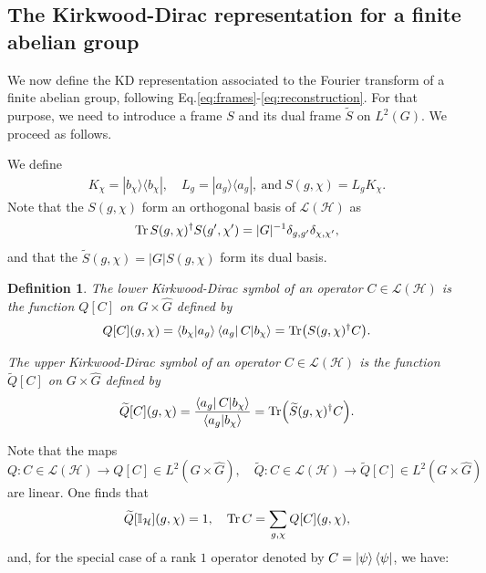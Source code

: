 \documentclass[a4paper, notitlepage, 11pt]{article}
\numberwithin{equation}{section}
\newcommand{\cket}[1]{|#1\rangle}
\newcommand{\bracket}[2]{\langle #1 | #2\rangle}
\newcommand{\mcl}[1]{\ensuremath{\mathcal{#1}}}
\newcommand{\Hcal}{{\mcl H}}
\newcommand{\bbone}{\mathbb{I}}
\renewcommand{\H}{\mcl{H}}
\newtheorem{definition}[Theorem]{Definition}
\begin{document}
\subsection{The Kirkwood-Dirac representation for a finite abelian group}\label{sec:KDsymbol}
We now define the KD representation associated to the Fourier transform of a finite abelian group, following Eq.\eqref{eq:frames}-\eqref{eq:reconstruction}. For that purpose, we need to introduce a frame $S$ and its dual frame $\widetilde{S}$ on $L^2(G)$. We proceed as follows.

We define
\begin{eqnarray}\label{eq:frame} K_\chi=|b_\chi\rangle\langle b_\chi|,\quad
 L_g=|a_g\rangle\langle a_g|, \mathrm{ \ and \ }  S(g, \chi)= L_g K_\chi.
\end{eqnarray}
Note that the $S(g,\chi)$ form an orthogonal basis of $\mathcal L(\mathcal H)$ as
\begin{equation}
    \Tr S(g,\chi)^\dagger S(g',\chi')=|G|^{-1}\delta_{g,g'}\delta_{\chi,\chi'},
\end{equation}
and that the $\widetilde{S}(g,\chi)=|G|S(g, \chi)$ form its dual basis. 
\begin{definition}
The lower Kirkwood-Dirac symbol of an operator $C\in\mathcal L(\H)$   is the function $Q[C]$ on $G\times \hat G$ defined by
\begin{equation}
Q[C](g,\chi)=\bracket{b_\chi}{a_g}\bra{a_g}C\cket{ b_\chi}=\Tr(S(g,\chi)^\dagger C). 
\end{equation}

The upper Kirkwood-Dirac symbol  of an operator $C\in\mathcal L(\H)$ is the function $\widetilde{Q}[C]$ on $G\times \hat G$ defined by 
\begin{equation}
\widetilde{Q}[C](g,\chi)=\frac{\bra{a_g}C \cket{b_\chi}}{\bracket{a_g} {b_\chi}}=\Tr(\widetilde{S}(g,\chi)^\dagger C). 
\end{equation}
\end{definition}
Note that the maps
\begin{equation}\label{eq:Qmapdef}
Q: C\in \mathcal L(\Hcal)\to Q[C] \in L^2(G\times\widehat G),\quad
\widetilde{Q}: C\in \mathcal L(\Hcal)\to \widetilde{Q}[C] \in L^2(G\times\widehat G) 
\end{equation}
are linear.
One finds that
\begin{equation}
  \widetilde{Q}[\bbone_{\mathcal H}](g,\chi)=1,\quad   \Tr C=\sum_{g,\chi} Q[C](g,\chi),
\end{equation}
and, for the special case of a rank $1$ operator denoted by $C = \cket{\psi}\bra{\psi} $, we have:
\end{document}
